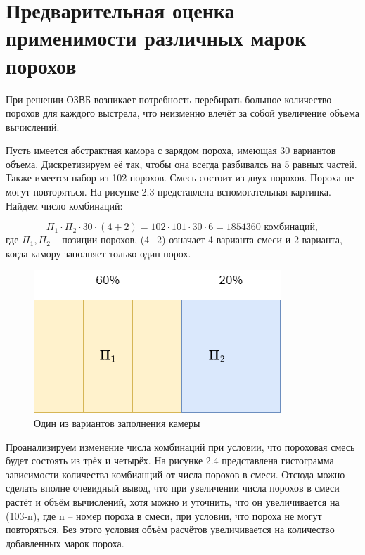 \documentclass[14pt, a4paper]{extreport} %
\begin{document}
\section{Предварительная оценка применимости различных марок порохов}

При решении ОЗВБ возникает потребность перебирать большое количество порохов для каждого выстрела, что неизменно влечёт за собой увеличение объема вычислений.

Пусть имеется абстрактная камора с зарядом пороха, имеющая 30 вариантов объема. Дискретизируем её так, чтобы она всегда разбивалсь на 5 равных частей. Также имеется набор из 102 порохов. Смесь состоит из двух порохов. Пороха не могут повторяться. На рисунке 2.3 представлена вспомогательная картинка.
Найдем число комбинаций: 

\[
 \Pi_1 \cdot \Pi_2 \cdot 30 \cdot (4+2) = 102 \cdot 101 \cdot 30 \cdot 6 = 1854360 \text{ комбинаций},
\]
где $\Pi_1, \Pi_2$ -- позиции порохов, (4+2) означает 4 варианта смеси и 2 варианта, когда камору заполняет только один порох.

\begin{figure}[h]
\centering
\includegraphics[width=0.3\textheight]{imgs/KAMORA.png}
\caption{Один из вариантов заполнения камеры}
\end{figure}

Проанализируем изменение числа комбинаций при условии, что пороховая смесь будет состоять из трёх и четырёх. На рисунке 2.4 представлена гистограмма зависимости количества комбианций от числа порохов в смеси.
Отсюда можно сделать вполне очевидный вывод, что при увеличении числа порохов в смеси растёт и объём вычислений, хотя можно и уточнить, что он увеличивается на (103-n), где n -- номер пороха в смеси, при условии, что пороха не могут повторяться. Без
этого условия объём расчётов увеличивается на количество добавленных марок пороха.
\end{document}
